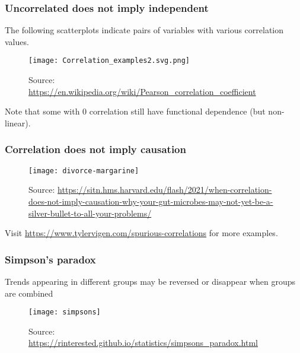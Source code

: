 \documentclass[usenames,dvipsnames,smaller%
]{beamer}
\newcommand{\?}{\stackrel{?}{=}}
\begin{document}
\begin{frame}
  \frametitle{Uncorrelated does not imply independent }
  \pause

  The following scatterplots indicate pairs of variables with various correlation values.
  \pause
  
    \begin{figure}      \centering
      \texttt{[image: Correlation\_examples2.svg.png]}
      \caption{Source: \url{https://en.wikipedia.org/wiki/Pearson_correlation_coefficient}}
    \end{figure}

  \pause

  Note that some with 0 correlation still have functional dependence (but non-linear).
\end{frame}

\begin{frame}
  \frametitle{Correlation does not imply causation}
  \pause

  \begin{figure}
    \centering
    \texttt{[image: divorce-margarine]}
    \caption{Source: \tiny \url{https://sitn.hms.harvard.edu/flash/2021/when-correlation-does-not-imply-causation-why-your-gut-microbes-may-not-yet-be-a-silver-bullet-to-all-your-problems/}}
  \end{figure}

  \pause
  
  Visit \url{https://www.tylervigen.com/spurious-correlations} for more examples.
  
\end{frame}

\begin{frame}
  
  \frametitle{Simpson's paradox}

  \pause

  Trends appearing in different groups may be reversed or disappear when groups are combined

  \pause

  \begin{figure} \centering \texttt{[image: simpsons]}
    \caption{Source: \url{https://rinterested.github.io/statistics/simpsons_paradox.html}}
  \end{figure}

\end{frame}
\end{document}
